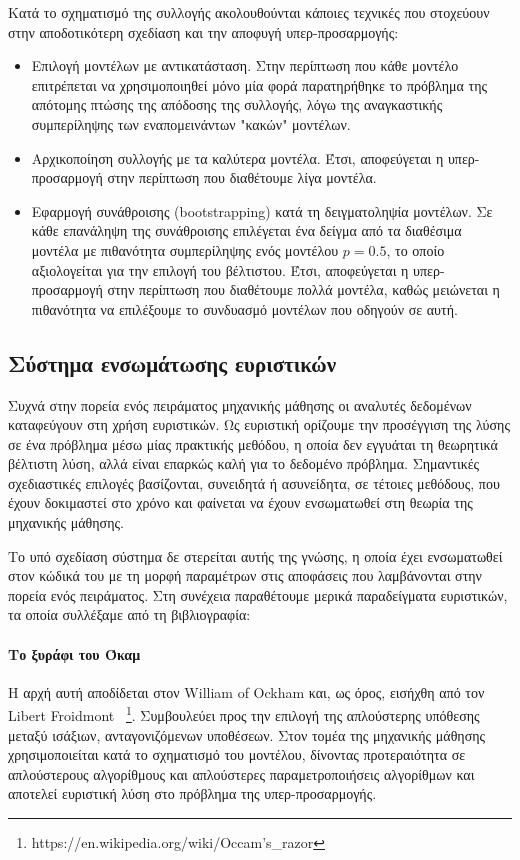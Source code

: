 Κατά το σχηματισμό της συλλογής ακολουθούνται κάποιες τεχνικές που στοχεύουν στην αποδοτικότερη σχεδίαση και την αποφυγή υπερ-προσαρμογής:
\begin{itemize}
	\item Επιλογή μοντέλων με αντικατάσταση. Στην περίπτωση που κάθε μοντέλο επιτρέπεται να χρησιμοποιηθεί μόνο μία φορά παρατηρήθηκε το πρόβλημα της απότομης πτώσης της απόδοσης της συλλογής, λόγω της αναγκαστικής συμπερίληψης των εναπομεινάντων "κακών" μοντέλων. 
	\item Αρχικοποίηση συλλογής με τα καλύτερα μοντέλα. Έτσι, αποφεύγεται η υπερ-προσαρμογή στην περίπτωση που διαθέτουμε λίγα μοντέλα.
	\item Εφαρμογή συνάθροισης (bootstrapping) κατά τη δειγματοληψία μοντέλων. Σε κάθε επανάληψη της συνάθροισης επιλέγεται ένα δείγμα από τα διαθέσιμα μοντέλα με πιθανότητα συμπερίληψης ενός μοντέλου $p=0.5$, το οποίο αξιολογείται για την επιλογή του βέλτιστου. Έτσι, αποφεύγεται η υπερ-προσαρμογή στην περίπτωση που διαθέτουμε πολλά μοντέλα, καθώς μειώνεται η πιθανότητα να επιλέξουμε το συνδυασμό μοντέλων που οδηγούν σε αυτή.
\end{itemize} 
\subsection{Σύστημα ενσωμάτωσης ευριστικών}
Συχνά στην πορεία ενός πειράματος μηχανικής μάθησης οι αναλυτές δεδομένων καταφεύγουν στη χρήση ευριστικών. Ως ευριστική ορίζουμε την προσέγγιση της λύσης σε ένα πρόβλημα μέσω μίας πρακτικής μεθόδου, η οποία δεν εγγυάται τη θεωρητικά βέλτιστη λύση, αλλά είναι επαρκώς καλή για το δεδομένο πρόβλημα. Σημαντικές σχεδιαστικές επιλογές βασίζονται, συνειδητά ή ασυνείδητα, σε τέτοιες μεθόδους, που έχουν δοκιμαστεί στο χρόνο και φαίνεται να έχουν ενσωματωθεί στη θεωρία της μηχανικής μάθησης.

Το υπό σχεδίαση σύστημα δε στερείται αυτής της γνώσης, η οποία έχει ενσωματωθεί στον κώδικά του με τη μορφή παραμέτρων στις αποφάσεις που λαμβάνονται στην πορεία ενός πειράματος. Στη συνέχεια παραθέτουμε μερικά παραδείγματα ευριστικών, τα οποία συλλέξαμε από τη βιβλιογραφία:

\paragraph{Το ξυράφι του Όκαμ} Η αρχή αυτή αποδίδεται στον William of Ockham και, ως όρος, εισήχθη από τον Libert Froidmont ~\footnote{https://en.wikipedia.org/wiki/Occam's\_razor}. Συμβουλεύει προς την επιλογή της απλούστερης υπόθεσης μεταξύ ισάξιων, ανταγονιζόμενων υποθέσεων. Στον τομέα της μηχανικής μάθησης χρησιμοποιείται κατά το σχηματισμό του μοντέλου, δίνοντας προτεραιότητα σε απλούστερους αλγορίθμους και απλούστερες παραμετροποιήσεις αλγορίθμων και αποτελεί ευριστική λύση στο πρόβλημα της υπερ-προσαρμογής. 

